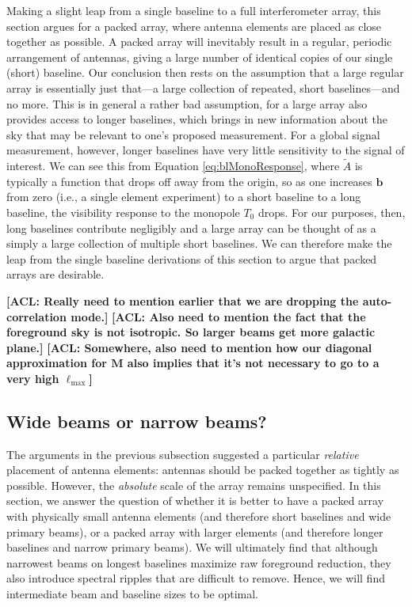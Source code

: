 \documentclass[twolcolumn,apj,iop,numberedappendix]{emulateapj}
\newcommand{\M}{\mathbf{M}}
\newcommand{\acl}[1]{{\color{red} \textbf{[ACL:  #1]}}}
\begin{document}
Making a slight leap from a single baseline to a full interferometer array, this section argues for a packed array, where antenna elements are placed as close together as possible. A packed array will inevitably result in a regular, periodic arrangement of antennas, giving a large number of identical copies of our single (short) baseline. Our conclusion then rests on the assumption that a large regular array is essentially just that---a large collection of repeated, short baselines---and no more. This is in general a rather bad assumption, for a large array also provides access to longer baselines, which brings in new information about the sky that may be relevant to one's proposed measurement. For a global signal measurement, however, longer baselines have very little sensitivity to the signal of interest. We can see this from Equation \eqref{eq:blMonoResponse}, where $\widetilde{A}$ is typically a function that drops off away from the origin, so as one increases $\mathbf{b}$ from zero (i.e., a single element experiment) to a short baseline to a long baseline, the visibility response to the monopole $T_0$ drops. For our purposes, then, long baselines contribute negligibly and a large array can be thought of as a simply a large collection of multiple short baselines. We can therefore make the leap from the single baseline derivations of this section to argue that packed arrays are desirable.

\acl{Really need to mention earlier that we are dropping the auto-correlation mode.}
\acl{Also need to mention the fact that the foreground sky is not isotropic. So larger beams get more galactic plane.}
\acl{Somewhere, also need to mention how our diagonal approximation for $\M$ also implies that it's not necessary to go to a very high $\ell_\textrm{max}$}

\subsection{Wide beams or narrow beams?}
\label{sec:beamSize}

The arguments in the previous subsection suggested a particular \emph{relative} placement of antenna elements: antennas should be packed together as tightly as possible. However, the \emph{absolute} scale of the array remains unspecified. In this section, we answer the question of whether it is better to have a packed array with physically small antenna elements (and therefore short baselines and wide primary beams), or a packed array with larger elements (and therefore longer baselines and narrow primary beams). We will ultimately find that although narrowest beams on longest baselines maximize raw foreground reduction, they also introduce spectral ripples that are difficult to remove. Hence, we will find intermediate beam and baseline sizes to be optimal.
\end{document}
